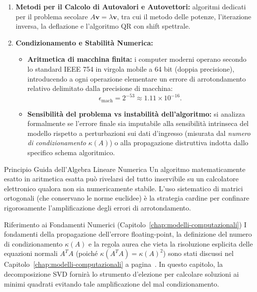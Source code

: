 \begin{enumerate}
    \item \textbf{Metodi per il Calcolo di Autovalori e Autovettori:} algoritmi dedicati per il problema secolare $A\mathbf{v} = \lambda \mathbf{v}$, tra cui il metodo delle potenze, l'iterazione inversa, la deflazione e l'algoritmo QR con shift spettrale.

    \item \textbf{Condizionamento e Stabilit\`a Numerica:}
    \begin{itemize}
        \item \textbf{Aritmetica di macchina finita:} i computer moderni operano secondo lo standard IEEE 754 in virgola mobile a 64 bit (doppia precisione), introducendo a ogni operazione elementare un errore di arrotondamento relativo delimitato dalla precisione di macchina:
        \begin{equation}
            \epsilon_{\text{mach}} = 2^{-53} \approx 1.11 \times 10^{-16}.
        \end{equation}
        \item \textbf{Sensibilit\`a del problema vs instabilit\`a dell'algoritmo:} si analizza formalmente se l'errore finale sia imputabile alla sensibilit\`a intrinseca del modello rispetto a perturbazioni sui dati d'ingresso (misurata dal \textit{numero di condizionamento} $\kappa(A)$) o alla propagazione distruttiva indotta dallo specifico schema algoritmico.
    \end{itemize}
\end{enumerate}

\begin{alertblock}{Principio Guida dell'Algebra Lineare Numerica}
Un algoritmo matematicamente esatto in aritmetica esatta pu\`o rivelarsi del tutto inservibile su un calcolatore elettronico qualora non sia numericamente stabile. L'uso sistematico di matrici ortogonali (che conservano le norme euclidee) \`e la strategia cardine per confinare rigorosamente l'amplificazione degli errori di arrotondamento.
\end{alertblock}

\begin{noteblock}{Riferimento ai Fondamenti Numerici (Capitolo~\ref{chap:modelli-computazionali})}
I fondamenti della propagazione dell'errore floating-point, la definizione del numero di condizionamento $\kappa(A)$ e la regola aurea che vieta la risoluzione esplicita delle equazioni normali $A^T A$ (poich\'e $\kappa(A^T A) = \kappa(A)^2$) sono stati discussi nel Capitolo~\ref{chap:modelli-computazionali} a pagina~\pageref{rem:regola-aurea-normal-equations}. In questo capitolo, la decomposizione SVD fornir\`a lo strumento d'elezione per calcolare soluzioni ai minimi quadrati evitando tale amplificazione del mal condizionamento.
\end{noteblock}

